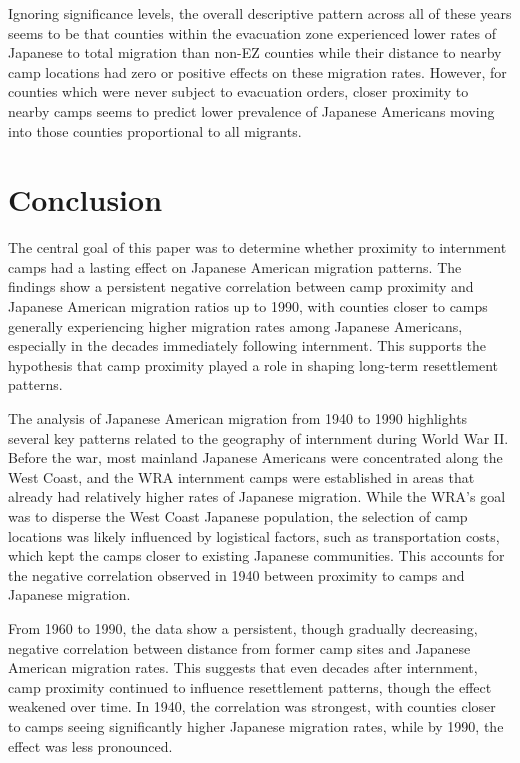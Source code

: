 \documentclass[12pt]{article}
\begin{document}
Ignoring significance levels, the overall descriptive pattern across all of these years seems to be that counties within the evacuation zone experienced lower rates of Japanese to total migration than non-EZ counties while their distance to nearby camp locations had zero or positive effects on these migration rates.
However, for counties which were never subject to evacuation orders, 
closer proximity to nearby camps seems to predict lower prevalence of Japanese Americans moving into those counties proportional to all migrants.

\section{Conclusion}\label{conclusion}

The central goal of this paper was to determine whether proximity to internment camps had a lasting effect on Japanese American migration patterns. The findings show a persistent negative correlation between camp proximity and Japanese American migration ratios up to 1990, with counties closer to camps generally experiencing higher migration rates among Japanese Americans, especially in the decades immediately following internment. This supports the hypothesis that camp proximity played a role in shaping long-term resettlement patterns.

The analysis of Japanese American migration from 1940 to 1990 highlights several key patterns related to the geography of internment during World War II. Before the war, most mainland Japanese Americans were concentrated along the West Coast, and the WRA internment camps were established in areas that already had relatively higher rates of Japanese migration. While the WRA's goal was to disperse the West Coast Japanese population, the selection of camp locations was likely influenced by logistical factors, such as transportation costs, which kept the camps closer to existing Japanese communities. This accounts for the negative correlation observed in 1940 between proximity to camps and Japanese migration.

From 1960 to 1990, the data show a persistent, though gradually decreasing, negative correlation between distance from former camp sites and Japanese American migration rates. This suggests that even decades after internment, camp proximity continued to influence resettlement patterns, though the effect weakened over time. In 1940, the correlation was strongest, with counties closer to camps seeing significantly higher Japanese migration rates, while by 1990, the effect was less pronounced.
\end{document}
